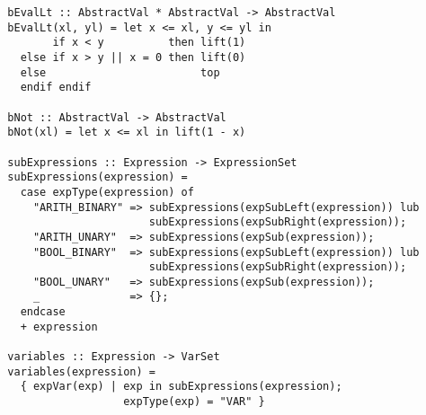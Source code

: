 \documentclass[a4paper]{article}
\begin{document}
\begin{verbatim}
  bEvalLt :: AbstractVal * AbstractVal -> AbstractVal
  bEvalLt(xl, yl) = let x <= xl, y <= yl in
         if x < y          then lift(1)
    else if x > y || x = 0 then lift(0)
    else                        top
    endif endif

  bNot :: AbstractVal -> AbstractVal
  bNot(xl) = let x <= xl in lift(1 - x)

  subExpressions :: Expression -> ExpressionSet
  subExpressions(expression) =
    case expType(expression) of
      "ARITH_BINARY" => subExpressions(expSubLeft(expression)) lub
                        subExpressions(expSubRight(expression));
      "ARITH_UNARY"  => subExpressions(expSub(expression));
      "BOOL_BINARY"  => subExpressions(expSubLeft(expression)) lub
                        subExpressions(expSubRight(expression));
      "BOOL_UNARY"   => subExpressions(expSub(expression));
      _              => {}; 
    endcase
    + expression

  variables :: Expression -> VarSet
  variables(expression) =
    { expVar(exp) | exp in subExpressions(expression);
                    expType(exp) = "VAR" }
\end{verbatim}
\end{document}
